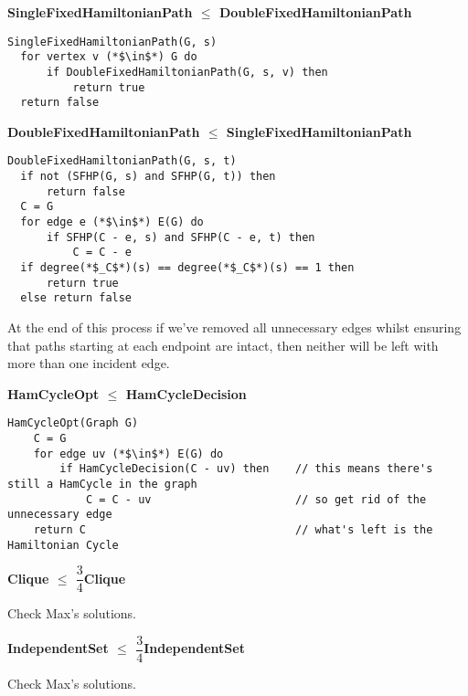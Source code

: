 \documentclass[12pt]{article}
\providecommand{\reducible}[2]{
  \textbf{#1} $\leq$ \textbf{#2}
}
\begin{document}
\begin{centering}\textbf{\reducible{SingleFixedHamiltonianPath}{DoubleFixedHamiltonianPath}}\par\end{centering}
\begin{lstlisting}
SingleFixedHamiltonianPath(G, s)
  for vertex v (*$\in$*) G do
      if DoubleFixedHamiltonianPath(G, s, v) then
          return true
  return false
\end{lstlisting}

\begin{centering}\textbf{\reducible{DoubleFixedHamiltonianPath}{SingleFixedHamiltonianPath}}\par\end{centering}
\begin{lstlisting}
DoubleFixedHamiltonianPath(G, s, t)
  if not (SFHP(G, s) and SFHP(G, t)) then
      return false
  C = G
  for edge e (*$\in$*) E(G) do
      if SFHP(C - e, s) and SFHP(C - e, t) then
          C = C - e
  if degree(*$_C$*)(s) == degree(*$_C$*)(s) == 1 then
      return true
  else return false
\end{lstlisting}
At the end of this process if we've removed all unnecessary edges whilst ensuring that paths starting at each endpoint are
intact, then neither will be left with more than one incident edge.

\begin{centering}\textbf{\reducible{HamCycleOpt}{HamCycleDecision}}\par\end{centering}
\begin{lstlisting}
HamCycleOpt(Graph G)
    C = G
    for edge uv (*$\in$*) E(G) do
        if HamCycleDecision(C - uv) then    // this means there's still a HamCycle in the graph
            C = C - uv                      // so get rid of the unnecessary edge
    return C                                // what's left is the Hamiltonian Cycle
\end{lstlisting}


\begin{centering}\textbf{\reducible{Clique}{$\dfrac{3}{4}$Clique}}\par\end{centering}
Check Max's solutions.

\begin{centering}\textbf{\reducible{IndependentSet}{$\dfrac{3}{4}$IndependentSet}}\par\end{centering}
Check Max's solutions.
\end{document}
